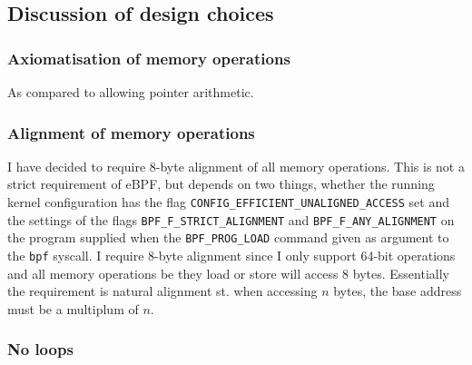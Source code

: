 \subsection{Discussion of design choices}
\label{subsec:discussion_of_design_choices}

\subsubsection*{Axiomatisation of memory operations}

As compared to allowing pointer arithmetic.

\subsubsection*{Alignment of memory operations}

I have decided to require 8-byte alignment of all memory operations. This is not a strict requirement of eBPF, but depends on two things, whether the running kernel configuration has the flag \texttt{CONFIG\_EFFICIENT\_UNALIGNED\_ACCESS} set and the settings of the flags \texttt{BPF\_F\_STRICT\_ALIGNMENT} and \texttt{BPF\_F\_ANY\_ALIGNMENT} on the program supplied when the \texttt{BPF\_PROG\_LOAD} command given as argument to the \texttt{bpf} syscall.
I require 8-byte alignment since I only support 64-bit operations and all memory operations be they load or store will access 8 bytes. Essentially the requirement is natural alignment st. when accessing $n$ bytes, the base address must be a multiplum of $n$. 

\subsubsection*{No loops}


